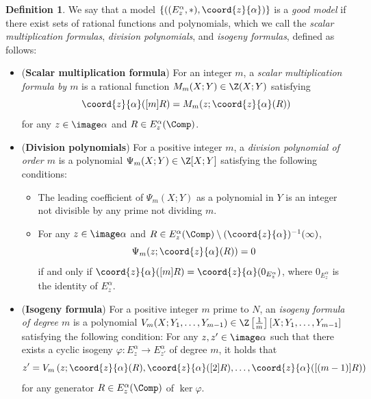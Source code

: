 \documentclass{amsart}
\theoremstyle{definition}
\newtheorem{definition}[theorem]{Definition}
\theoremstyle{remark}
\numberwithin{equation}{section}
\begin{document}
\begin{definition}
    We say that a model $\{((E_z^\alpha, \ast), \coord{z}{\alpha})\}$
    is a \emph{good model} if
    there exist sets of rational functions and polynomials,
    which we call the \emph{scalar multiplication formulas},
    \emph{division polynomials}, and \emph{isogeny formulas},
    defined as follows:
    \begin{itemize}
        \item (\textbf{Scalar multiplication formula})
            For an integer $m$,
            a \emph{scalar multiplication formula by $m$}
            is a rational function $M_m(X; Y) \in \Z(X; Y)$
            satisfying
            \begin{equation*}
                \coord{z}{\alpha}([m]R) = M_m(z; \coord{z}{\alpha}(R))
            \end{equation*}
            for any $z \in \image \alpha$ and $R \in E_z^\alpha(\Comp)$.
        \item (\textbf{Division polynomials})
            For a positive integer $m$,
            a \emph{division polynomial of order $m$}
            is a polynomial
            $\Psi_m(X; Y) \in \Z[X; Y]$ satisfying the following conditions:
            \begin{itemize}
                \item The leading coefficient of $\Psi_m(X; Y)$ as a polynomial in $Y$ is an integer not divisible by any prime not dividing $m$.
                \item For any $z \in \image \alpha$ and $R \in E_z^\alpha(\Comp) \setminus (\coord{z}{\alpha})^{-1}(\infty)$,
                    \begin{equation*}
                        \Psi_m(z; \coord{z}{\alpha}(R)) = 0
                    \end{equation*}
                    if and only if $\coord{z}{\alpha}([m]R) = \coord{z}{\alpha}(0_{E_z^\alpha})$,
                    where $0_{E_z^\alpha}$ is the identity of $E_z^\alpha$.
            \end{itemize}
        \item (\textbf{Isogeny formula})
            For a positive integer $m$ prime to $N$,
            an \emph{isogeny formula of degree $m$}
            is a polynomial
            $V_m(X; Y_1, \dots, Y_{m-1}) \in \Z\left[\frac{1}{m}\right][X; Y_1, \dots, Y_{m-1}]$
            satisfying the following condition:
            For any $z, z' \in \image \alpha$ such that
            there exists
            a cyclic isogeny $\varphi: E_z^\alpha \to E_{z'}^\alpha$ of degree $m$,
            it holds that
            \begin{equation*}
                z' = V_m\left(z; \coord{z}{\alpha}(R), \coord{z}{\alpha}([2]R), \dots, \coord{z}{\alpha}([(m-1)]R)\right)
            \end{equation*}
            for any generator $R \in E_z^\alpha(\Comp)$ of $\ker \varphi$.
    \end{itemize}
\end{definition}
\end{document}
